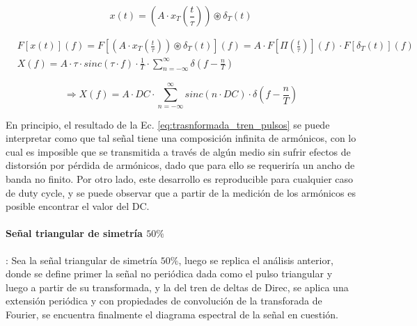 \begin{itemize}
    \begin{equation}
        x(t) = \left(A \cdot x_T(\frac{t}{\tau}) \right) \circledast \delta_T(t)
        \label{eq:definicion_tren_pulsos}
    \end{equation}

    \begin{align*}
        & F \left[ x(t) \right](f) = F \left[ \left(A \cdot x_T(\frac{t}{\tau}) \right) \circledast \delta_T(t) \right](f) = A \cdot F \left[ \Pi(\frac{t}{\tau}) \right] (f) \cdot F \left[ \delta_T(t) \right](f) \\
        & X(f) = A \cdot \tau \cdot sinc(\tau \cdot f) \cdot \frac{1}{T} \cdot \sum_{n = - \infty} ^{\infty} \delta(f - \frac{n}{T})
    \end{align*}

    \begin{equation}
        \Rightarrow X(f) = A \cdot DC \cdot \sum_{n = - \infty}^{\infty} sinc(n \cdot DC) \cdot \delta (f - \frac{n}{T})
        \label{eq:trasnformada_tren_pulsos}
    \end{equation}

    En principio, el resultado de la Ec. \ref{eq:trasnformada_tren_pulsos} se puede interpretar como que tal se\~nal tiene una composici\'on infinita de arm\'onicos, con lo cual es imposible que se transmitida a trav\'es de alg\'un medio sin
    sufrir efectos de distorsi\'on por p\'erdida de arm\'onicos,
    dado que para ello se requerir\'ia un ancho de banda no finito. Por otro lado, este desarrollo es reproducible para cualquier caso de duty cycle, y se puede observar que a partir de la medici\'on de los arm\'onicos es posible encontrar
    el valor del DC.
\end{itemize}

\paragraph{Se\~nal triangular de simetr\'ia $50\%$}: Sea la se\~nal triangular de simetr\'ia $50\%$, luego se replica el an\'alisis anterior, donde se define primer la se\~nal no peri\'odica dada como el pulso triangular
y luego a partir de su transformada, y la del tren de deltas de Direc, se aplica una extensi\'on peri\'odica y con propiedades de convoluci\'on de la transforada de Fourier, se encuentra finalmente el diagrama espectral de
la se\~nal en cuesti\'on.


